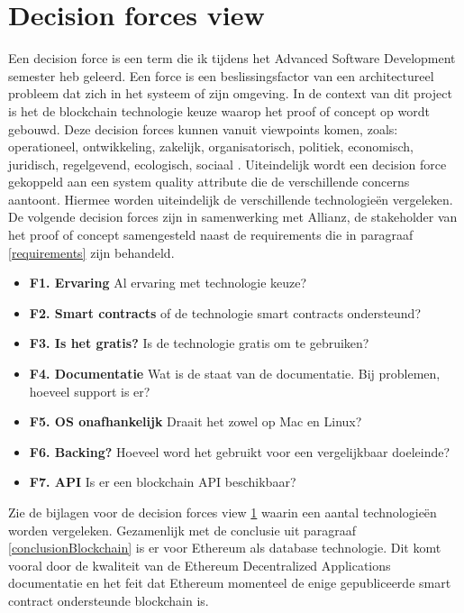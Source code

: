 \newpage

\section{Decision forces view}\label{decisionForcesView}
Een decision force is een term die ik tijdens het Advanced Software Development semester heb geleerd. Een force is een beslissingsfactor van een architectureel probleem dat zich in het systeem of zijn omgeving. In de context van dit project is het de blockchain technologie keuze waarop het proof of concept op wordt gebouwd. Deze decision forces kunnen vanuit viewpoints komen, zoals: operationeel, ontwikkeling, zakelijk, organisatorisch, politiek, economisch, juridisch, regelgevend, ecologisch, sociaal \cite{architectureForces}. Uiteindelijk wordt een decision force gekoppeld aan een system quality attribute die de verschillende concerns aantoont. Hiermee worden uiteindelijk de verschillende technologieën vergeleken. De volgende decision forces zijn in samenwerking met Allianz, de stakeholder van het proof of concept samengesteld naast de requirements die in paragraaf \ref{requirements} zijn behandeld.

\begin{itemize}
  \item \textbf{F1. Ervaring} Al ervaring met technologie keuze?
  \item \textbf{F2. Smart contracts} of de technologie smart contracts ondersteund?
  \item \textbf{F3. Is het gratis?} Is de technologie gratis om te gebruiken? 
  \item \textbf{F4. Documentatie} Wat is de staat van de documentatie. Bij problemen, hoeveel support is er?
  \item \textbf{F5. OS onafhankelijk} Draait het zowel op Mac en Linux? 
  \item \textbf{F6. Backing?} Hoeveel word het gebruikt voor een vergelijkbaar doeleinde?
  \item \textbf{F7. API} Is er een blockchain API beschikbaar?
\end{itemize}

Zie de bijlagen voor de decision forces view \ref{decisionForcesView} waarin een aantal technologieën worden vergeleken. Gezamenlijk met de conclusie uit paragraaf \ref{conclusionBlockchain} is er voor Ethereum als database technologie. Dit komt vooral door de kwaliteit van de Ethereum Decentralized Applications documentatie en het feit dat Ethereum momenteel de enige gepubliceerde smart contract ondersteunde blockchain is.\par

